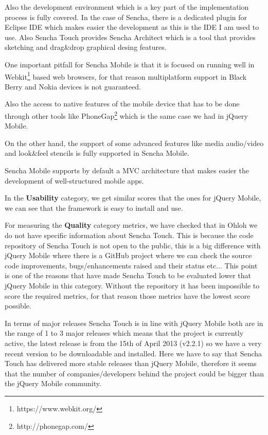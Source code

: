 \documentclass[a4paper,12pt]{book}
\begin{document}
Also the development environment which is a key part of the implementation process is fully covered. In the case of Sencha, there is a dedicated plugin for Eclipse IDE\cite{sencha Eclipse Plugin}  which makes easier the development as this is the IDE I am used to use. Also Sencha Touch provides Sencha Architect\cite{sencha Architect} which is a tool that provides sketching and drag\&drop graphical desing features.

One important pitfall for Sencha Mobile is that it is focused on running well in Webkit\footnote{https://www.webkit.org/}  based web browsers, for that reason multiplatform support in Black Berry and Nokia devices is not guaranteed.

Also the access to native features of the mobile device that has to be done through other tools like PhoneGap\footnote{http://phonegap.com/} which is the same case we had in jQuery Mobile. 

On the other hand, the support of some advanced features like media audio/video and look\&feel stencils is fully supported in Sencha Mobile.

Sencha Mobile supports by default a MVC architecture\cite{sencha MVC}  that makes easier the development of well-structured mobile apps.

In the \textbf{Usability} category, we get similar scores that the ones for jQuery Mobile, we can see that the framework is easy to install and use.

For measuring the \textbf{Quality} category metrics, we have checked that in Ohloh we do not have specific information about Sencha Touch\cite{Ohloh Sencha Touch}. This is because the code repository of Sencha Touch is not open to the public, this is a big difference with jQuery Mobile where there is a GitHub project where we can check the source code improvements, bugs/enhancements raised and their status etc... This point is one of the reasons that have made Sencha Touch to be evaluated lower that jQuery Mobile in this category. Without the repository it has been impossible to score the required metrics, for that reason those metrics have the lowest score possible.

In terms of major releases Sencha Touch is in line with jQuery Mobile both are in the range of 1 to 3 major releases which means that the project is currently active, the latest release is from the 15th of April 2013 (v2.2.1) so we have a very recent version to be downloadable and installed. Here we have to say that Sencha Touch has delivered more stable releases than jQuery Mobile, therefore it seems that the number of companies/developers behind the project could be bigger than the jQuery Mobile community.
\end{document}
